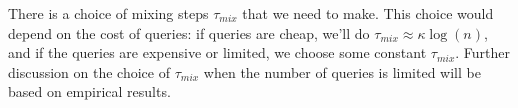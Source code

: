 \documentclass[11pt]{article}
\theoremstyle{remark}
\theoremstyle{definition}
\begin{document}
	There is a choice of mixing steps $\tau_{mix}$ that we need to make.
	This choice would depend on the cost of queries: if queries are cheap, we'll do 
	$\tau_{mix} \approx \kappa\log(n)$, and if the queries are expensive or limited, 
	we choose some constant $\tau_{mix}$.
	Further discussion on the choice of $\tau_{mix}$ when the number of queries is limited 
	will be based on empirical results.
\end{document}
